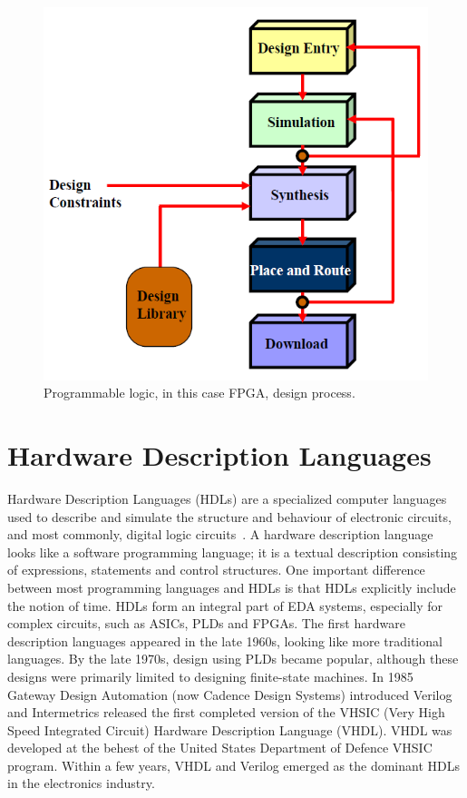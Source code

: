 \begin{figure}[H]
	\centering
	\includegraphics[width=0.4\linewidth]{IMG/ch3/FLOW}
	\caption{Programmable logic, in this case FPGA, design process.}
	\label{fig:flow}
\end{figure}

\section{Hardware Description Languages}
\noindent Hardware Description Languages (HDLs) are a specialized computer languages used to describe and simulate the structure and behaviour of electronic circuits, and most commonly, digital logic circuits~\cite{hdl}. A hardware description language looks like a software programming language; it is a textual description consisting of expressions, statements and control structures. One important difference between most programming languages and HDLs is that HDLs explicitly include the notion of time.
HDLs form an integral part of EDA systems, especially for complex circuits, such as ASICs, PLDs and FPGAs.
\newline
The first hardware description languages appeared in the late 1960s, looking like more traditional languages.
By the late 1970s, design using PLDs became popular, although these designs were primarily limited to designing finite-state machines.
In 1985 Gateway Design Automation (now Cadence Design Systems) introduced Verilog and Intermetrics released the first completed version of the VHSIC (Very High Speed Integrated Circuit) Hardware Description Language (VHDL).
VHDL was developed at the behest of the United States Department of Defence VHSIC program.
Within a few years, VHDL and Verilog emerged as the dominant HDLs in the electronics industry.
